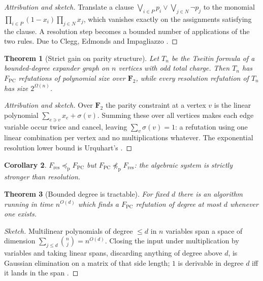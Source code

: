 \documentclass[11pt]{article}
\theoremstyle{plain}
\newtheorem{theorem}{Theorem}[section]
\newtheorem{corollary}[theorem]{Corollary}
\theoremstyle{definition}
\theoremstyle{remark}
\newcommand{\FF}{\mathbf{F}_{2}}
\newcommand{\PC}{F_{\mathrm{PC}}}
\newcommand{\Res}{F_{\mathrm{res}}}
\begin{document}
\begin{proof}[Attribution and sketch]
Translate a clause $\bigvee_{i\in P}p_{i}\vee\bigvee_{j\in N}\neg p_{j}$ to the
monomial $\prod_{i\in P}(1-x_{i})\prod_{j\in N}x_{j}$, which vanishes exactly
on the assignments satisfying the clause. A resolution step becomes a bounded
number of applications of the two rules. Due to Clegg, Edmonds and Impagliazzo
\cite{clegg}.
\end{proof}

\begin{theorem}[Strict gain on parity structure]\label{thm:tseitin}
Let $T_{n}$ be the Tseitin formula of a bounded-degree expander graph on $n$
vertices with odd total charge. Then $T_{n}$ has $\PC$ refutations of
polynomial size over $\FF$, while every resolution refutation of $T_{n}$ has
size $2^{\Omega(n)}$.
\end{theorem}

\begin{proof}[Attribution and sketch]
Over $\FF$ the parity constraint at a vertex $v$ is the linear polynomial
$\sum_{e\ni v}x_{e}+\sigma(v)$. Summing these over all vertices makes each edge
variable occur twice and cancel, leaving $\sum_{v}\sigma(v)=1$: a refutation
using one linear combination per vertex and no multiplications whatever. The
exponential resolution lower bound is Urquhart's \cite{urquhart}.
\end{proof}

\begin{corollary}
$\Res\preceq_{\mathrm{p}}\PC$ but $\PC\not\preceq_{\mathrm{p}}\Res$: the
algebraic system is strictly stronger than resolution.
\end{corollary}

\begin{theorem}[Bounded degree is tractable]\label{thm:degree}
For fixed $d$ there is an algorithm running in time $n^{O(d)}$ which finds a
$\PC$ refutation of degree at most $d$ whenever one exists.
\end{theorem}

\begin{proof}[Sketch]
Multilinear polynomials of degree $\le d$ in $n$ variables span a space of
dimension $\sum_{j\le d}\binom{n}{j}=n^{O(d)}$. Closing the input under
multiplication by variables and taking linear spans, discarding anything of
degree above $d$, is Gaussian elimination on a matrix of that side length; $1$
is derivable in degree $d$ iff it lands in the span \cite{clegg}.
\end{proof}
\end{document}

